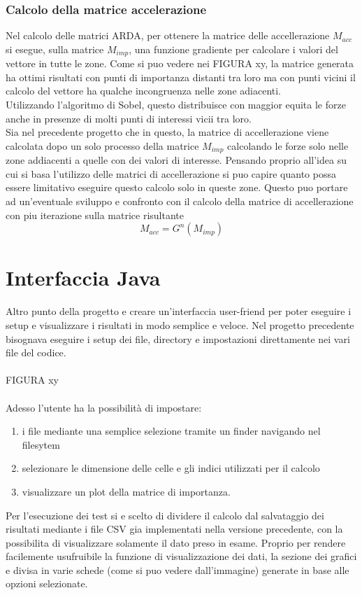 \subsubsection{Calcolo della matrice accelerazione}
Nel calcolo delle matrici ARDA, per ottenere la matrice delle accellerazione $M_{acc}$ si esegue, sulla
matrice $M_{imp}$, una funzione gradiente per calcolare i valori del vettore in tutte le zone. Come si puo
vedere nei FIGURA xy, la matrice generata ha ottimi risultati con punti di importanza distanti tra loro
ma con punti vicini il calcolo del vettore ha qualche incongruenza nelle zone adiacenti.\\
Utilizzando l'algoritmo di Sobel, questo distribuisce con maggior equita le forze anche in presenze di
molti punti di interessi vicii tra loro.\\
Sia nel precedente progetto che in questo, la matrice di accellerazione viene calcolata dopo un solo processo
della matrice $M_{imp}$ calcolando le forze solo nelle zone addiacenti a quelle con dei valori di interesse.
Pensando proprio all'idea su cui si basa l'utilizzo delle matrici di accellerazione si puo capire quanto possa
essere limitativo eseguire questo calcolo solo in queste zone. Questo puo portare ad un'eventuale sviluppo e
confronto con il calcolo della matrice di accellerazione con piu iterazione sulla matrice risultante
\begin{equation}
M_{acc} = G^{n}(M_{imp})
\end{equation}

\section{Interfaccia Java}
Altro punto della progetto e creare un'interfaccia user-friend per poter eseguire i setup e visualizzare
i risultati in modo semplice e veloce. Nel progetto precedente bisognava eseguire i setup dei file,
directory e impostazioni direttamente nei vari file del codice.\\
\\
FIGURA xy\\
\\
Adesso l'utente ha la possibilità di impostare:
\begin{enumerate}
    \item i file mediante una semplice selezione tramite un finder navigando nel filesytem
    \item selezionare le dimensione delle celle e gli indici utilizzati per il calcolo
    \item visualizzare un plot della matrice di importanza.
\end{enumerate}
Per l'esecuzione dei test si e scelto di dividere il calcolo dal salvataggio dei risultati mediante i file CSV
gia implementati nella versione precedente, con la possibilita di visualizzare solamente il dato preso in esame.
Proprio per rendere facilemente usufruibile la funzione di visualizzazione dei dati, la sezione dei grafici e
divisa in varie schede (come si puo vedere dall'immagine) generate in base alle opzioni selezionate.

